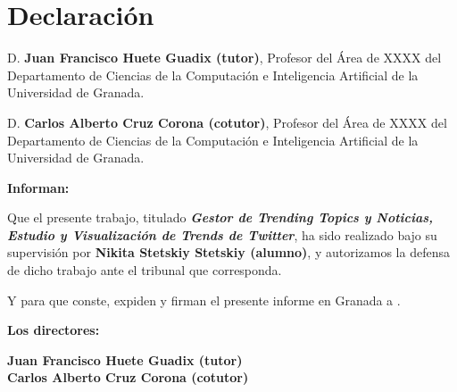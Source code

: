 \chapter*{Declaración}
\thispagestyle{empty}

\noindent D. \textbf{Juan Francisco Huete Guadix (tutor)}, Profesor del Área de XXXX del Departamento de Ciencias de la Computación e Inteligencia Artificial  de la Universidad de Granada.

\vspace{0.5cm}

\noindent D. \textbf{Carlos Alberto Cruz Corona (cotutor)}, Profesor del Área de XXXX del Departamento de Ciencias de la Computación e Inteligencia Artificial de la Universidad de Granada.


\vspace{0.5cm}

\noindent\textbf{Informan:}

\vspace{0.5cm}

\noindent Que el presente trabajo, titulado \textit{\textbf{Gestor de Trending Topics y Noticias, Estudio y Visualización de Trends de Twitter}}, ha sido realizado bajo su supervisión por \textbf{Nikita Stetskiy Stetskiy (alumno)}, y autorizamos la defensa de dicho trabajo ante el tribunal que corresponda.

\vspace{0.5cm}

\noindent Y para que conste, expiden y firman el presente informe en Granada a \myTime.

\vspace{1cm}

\noindent \textbf{Los directores:}

\vspace{5cm}

\noindent \textbf{Juan Francisco Huete Guadix (tutor)}
\\
\noindent \textbf{Carlos Alberto Cruz Corona (cotutor)}